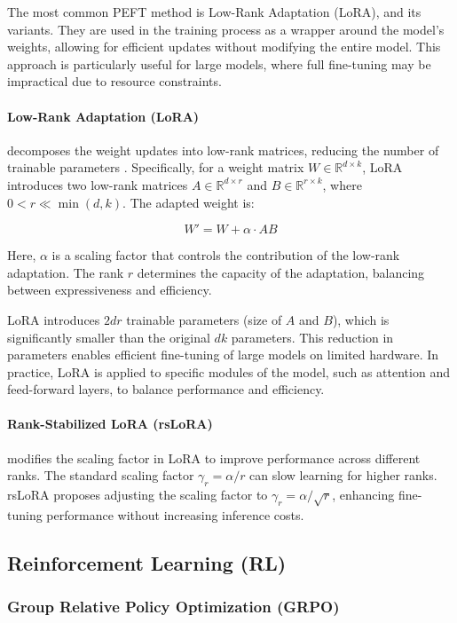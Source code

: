 The most common PEFT method is Low-Rank Adaptation (LoRA), and its variants. They are used in the training process as a wrapper around the model's weights, allowing for efficient updates without modifying the entire model. This approach is particularly useful for large models, where full fine-tuning may be impractical due to resource constraints.

\paragraph{Low-Rank Adaptation (LoRA)} decomposes the weight updates into low-rank matrices, reducing the number of trainable parameters \citep{huLoRALowRankAdaptation2021}. Specifically, for a weight matrix \( W \in \mathbb{R}^{d \times k} \), LoRA introduces two low-rank matrices \( A \in \mathbb{R}^{d \times r} \) and \( B \in \mathbb{R}^{r \times k} \), where \( 0 < r \ll \min(d, k) \). The adapted weight is:

\[
W' = W + \alpha \cdot A B
\]

Here, \( \alpha \) is a scaling factor that controls the contribution of the low-rank adaptation. The rank \( r \) determines the capacity of the adaptation, balancing between expressiveness and efficiency.

LoRA introduces \( 2dr \) trainable parameters (size of \( A \) and \( B \)), which is significantly smaller than the original \( dk \) parameters. This reduction in parameters enables efficient fine-tuning of large models on limited hardware. In practice, LoRA is applied to specific modules of the model, such as attention and feed-forward layers, to balance performance and efficiency.

\paragraph{Rank-Stabilized LoRA (rsLoRA)} modifies the scaling factor in LoRA to improve performance across different ranks. The standard scaling factor \( \gamma_r = \alpha / r \) can slow learning for higher ranks. rsLoRA proposes adjusting the scaling factor to \( \gamma_r = \alpha / \sqrt{r} \), enhancing fine-tuning performance without increasing inference costs.

\subsection{Reinforcement Learning (RL)} \label{app:rl}

\subsubsection{Group Relative Policy Optimization (GRPO)} \label{app:grpo}

